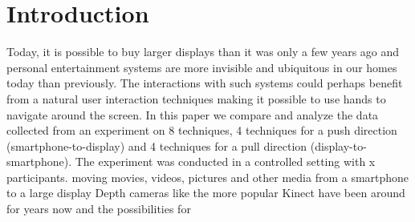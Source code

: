 \section{Introduction} \label{sec:introduction}
Today, it is possible to buy larger displays than it was only a few years ago and personal entertainment systems are more invisible and ubiquitous in our homes today than previously.
The interactions with such systems could perhaps benefit from a natural user interaction techniques making it possible to use hands to navigate around the screen.
In this paper we compare and analyze the data collected from an experiment on 8 techniques, 4 techniques for a push direction (smartphone-to-display) and 4 techniques for a pull direction (display-to-smartphone).
The experiment was conducted in a controlled setting with x participants.
moving movies, videos, pictures and other media from a smartphone to a large display
Depth cameras like the more popular Kinect have been around for years now and the possibilities for 